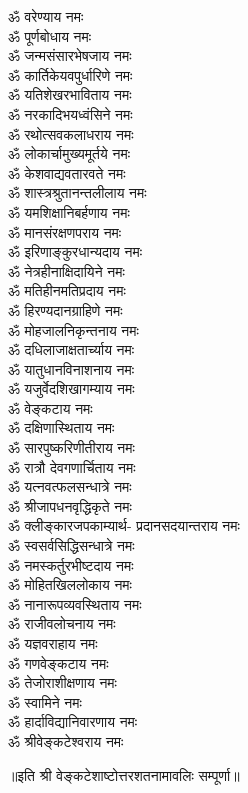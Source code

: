 \begin{multicols}{2}
\begin{flushleft}
        ॐ वरेण्याय नमः\\
        ॐ पूर्णबोधाय नमः\\
        ॐ जन्मसंसारभेषजाय नमः\\
        ॐ कार्तिकेयवपुर्धारिणे नमः\\
        ॐ यतिशेखरभाविताय नमः\\
        ॐ नरकादिभयध्वंसिने नमः\\
        ॐ रथोत्सवकलाधराय नमः\\
        ॐ लोकार्चामुख्यमूर्तये नमः\\
        ॐ केशवाद्यवतारवते नमः\hfill{}\\
                                                        
        ॐ शास्त्रश्रुतानन्तलीलाय नमः\\
        ॐ यमशिक्षानिबर्हणाय नमः\\
        ॐ मानसंरक्षणपराय नमः\\
        ॐ इरिणाङ्कुरधान्यदाय नमः\\
        ॐ नेत्रहीनाक्षिदायिने नमः\\
        ॐ मतिहीनमतिप्रदाय नमः\\
        ॐ हिरण्यदानग्राहिणे नमः\\
        ॐ मोहजालनिकृन्तनाय नमः\\
        ॐ दधिलाजाक्षतार्च्याय नमः\\
        ॐ यातुधानविनाशनाय नमः\hfill{}\\
                                                        
        ॐ यजुर्वेदशिखागम्याय नमः\\
        ॐ वेङ्कटाय नमः\\
        ॐ दक्षिणास्थिताय नमः\\
        ॐ सारपुष्करिणीतीराय  नमः\\
        ॐ रात्रौ  देवगणार्चिताय नमः\\
        ॐ यत्नवत्फलसन्धात्रे नमः\\
        ॐ श्रीजापधनवृद्धिकृते नमः\\
        ॐ क्लीङ्कारजपकाम्यार्थ-
        प्रदानसदयान्तराय  नमः\\
        ॐ स्वसर्वसिद्धिसन्धात्रे नमः\\
        ॐ नमस्कर्तुरभीष्टदाय नमः\hfill{}\\
        
        ॐ मोहितखिललोकाय नमः\\
        ॐ नानारूपव्यवस्थिताय नमः\\
        ॐ राजीवलोचनाय नमः\\
        ॐ यज्ञवराहाय नमः\\
        ॐ गणवेङ्कटाय नमः\\
        ॐ तेजोराशीक्षणाय नमः\\
        ॐ स्वामिने नमः\\
        ॐ हार्दाविद्यानिवारणाय नमः\hfill{}\\
        ॐ श्रीवेङ्कटेश्वराय नमः\\
    \end{flushleft}
\end{multicols}
\centerline{॥इति श्री वेङ्कटेशाष्टोत्तरशतनामावलिः सम्पूर्णा॥}
